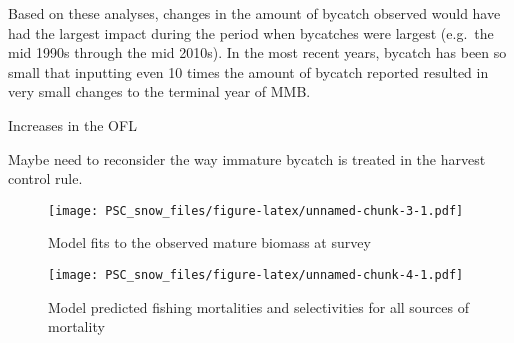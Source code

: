 \documentclass[]{article}
\begin{document}
Based on these analyses, changes in the amount of bycatch observed would
have had the largest impact during the period when bycatches were
largest (e.g.~the mid 1990s through the mid 2010s). In the most recent
years, bycatch has been so small that inputting even 10 times the amount
of bycatch reported resulted in very small changes to the terminal year
of MMB.

Increases in the OFL

Maybe need to reconsider the way immature bycatch is treated in the
harvest control rule.

\newpage

\begin{figure}
\centering
\texttt{[image: PSC\_snow\_files/figure-latex/unnamed-chunk-3-1.pdf]}
\caption{\label{mmbfits}Model fits to the observed mature biomass at
survey}
\end{figure}

\newpage

\begin{figure}
\centering
\texttt{[image: PSC\_snow\_files/figure-latex/unnamed-chunk-4-1.pdf]}
\caption{\label{predfmort}Model predicted fishing mortalities and
selectivities for all sources of mortality}
\end{figure}

\newpage
\end{document}
